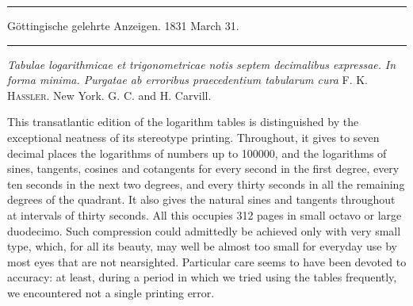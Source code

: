 \par{}\begin{center}\rule{0.7\linewidth}{0.4pt}\par Göttingische gelehrte Anzeigen. 1831 March 31.\par\rule{0.7\linewidth}{0.4pt}\end{center}

\noindent\textit{Tabulae logarithmicae et trigonometricae notis septem decimalibus expressae.}
\textit{In forma minima. Purgatae ab erroribus praecedentium tabularum cura} F. K. \textsc{Hassler.} New York. G. C. and H. Carvill.

This transatlantic edition of the logarithm tables is distinguished by the exceptional neatness of its stereotype printing. Throughout, it gives to seven decimal places the logarithms of numbers up to 100000, and the logarithms of sines, tangents, cosines and cotangents for every second in the first degree, every ten seconds in the next two degrees, and every thirty seconds in all the remaining degrees of the quadrant. It also gives the natural sines and tangents throughout at intervals of thirty seconds. All this occupies 312 pages in small octavo or large duodecimo. Such compression could admittedly be achieved only with very small type, which, for all its beauty, may well be almost too small for everyday use by most eyes that are not nearsighted. Particular care seems to have been devoted to accuracy: at least, during a period in which we tried using the tables frequently, we encountered not a single printing error.

